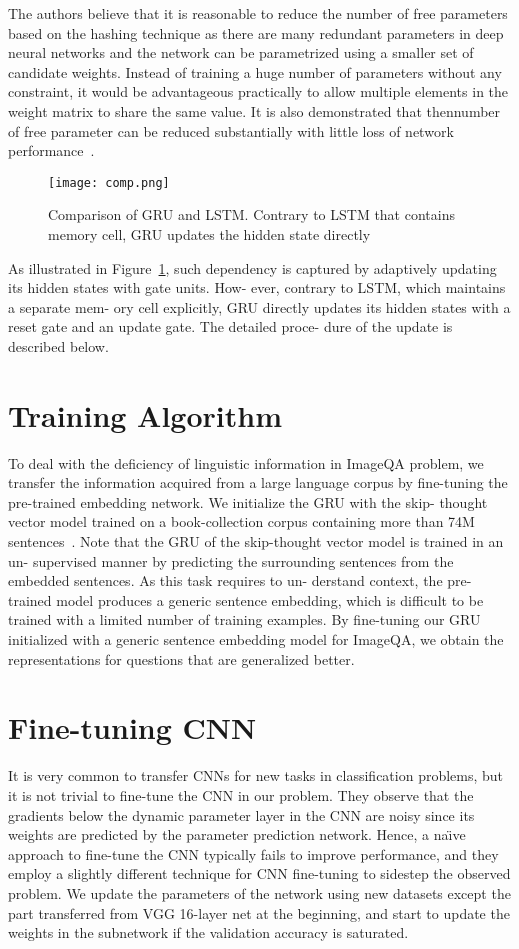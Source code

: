 \documentclass[10pt,twocolumn,letterpaper]{article}
\begin{document}
\par The authors believe that it is reasonable to reduce the number of free parameters based on the hashing technique as there are many redundant parameters in deep neural networks and the network can be parametrized using a smaller set of candidate weights. Instead of training a huge number of parameters without any constraint, it would be advantageous practically to allow multiple elements in the weight matrix to share the same value. It is also demonstrated that thennumber of free parameter can be reduced substantially with little loss of network performance~\cite{name3}.
\begin{figure}[!htb]
 \centering
 \texttt{[image: comp.png]}\\
 \caption{Comparison of GRU and LSTM. Contrary to LSTM that
contains memory cell, GRU updates the hidden state directly}\label{Figure1}
 \end{figure}
 \par As illustrated in Figure~\ref{Figure1}, such dependency is captured by
adaptively updating its hidden states with gate units. How-
ever, contrary to LSTM, which maintains a separate mem-
ory cell explicitly, GRU directly updates its hidden states
with a reset gate and an update gate. The detailed proce-
dure of the update is described below.
\section{Training Algorithm}
To deal with the deficiency of linguistic information in
ImageQA problem, we transfer the information acquired
from a large language corpus by fine-tuning the pre-trained
embedding network. We initialize the GRU with the skip-
thought vector model trained on a book-collection corpus
containing more than 74M sentences~\cite{name14}. Note that the
GRU of the skip-thought vector model is trained in an un-
supervised manner by predicting the surrounding sentences
from the embedded sentences. As this task requires to un-
derstand context, the pre-trained model produces a generic
sentence embedding, which is difficult to be trained with
a limited number of training examples. By fine-tuning our
GRU initialized with a generic sentence embedding model
for ImageQA, we obtain the representations for questions
that are generalized better.
\section{Fine-tuning CNN}
It is very common to transfer CNNs for new tasks in
classification problems, but it is not trivial to fine-tune the
CNN in our problem. They observe that the gradients below
the dynamic parameter layer in the CNN are noisy since its
weights are predicted by the parameter prediction network.
Hence, a naı̈ve approach to fine-tune the CNN typically fails to improve performance, and they employ a slightly different technique for CNN fine-tuning to sidestep the observed problem. We update the parameters of the network using
new datasets except the part transferred from VGG 16-layer
net at the beginning, and start to update the weights in the
subnetwork if the validation accuracy is saturated.
\end{document}
